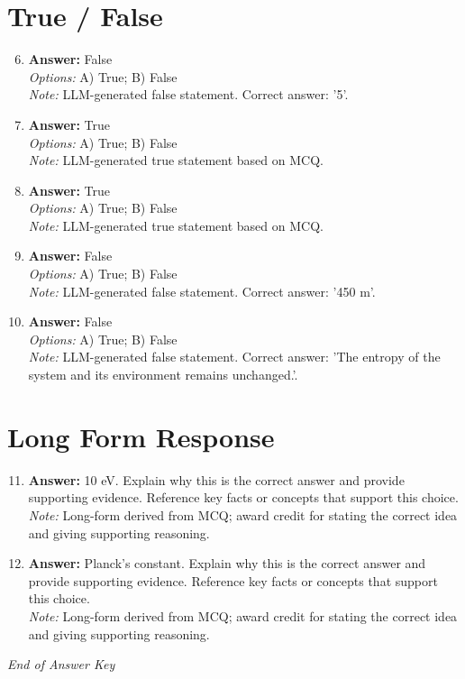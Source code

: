 \documentclass[12pt]{article}
\begin{document}
\section*{True / False}
\begin{enumerate}[label=\arabic*.]
\setcounter{enumi}{5}
\item \textbf{Answer:} False
\\ \textit{Options:} A) True; B) False
\\ \textit{Note:} LLM-generated false statement. Correct answer: '5'.
\item \textbf{Answer:} True
\\ \textit{Options:} A) True; B) False
\\ \textit{Note:} LLM-generated true statement based on MCQ.
\item \textbf{Answer:} True
\\ \textit{Options:} A) True; B) False
\\ \textit{Note:} LLM-generated true statement based on MCQ.
\item \textbf{Answer:} False
\\ \textit{Options:} A) True; B) False
\\ \textit{Note:} LLM-generated false statement. Correct answer: '450 m'.
\item \textbf{Answer:} False
\\ \textit{Options:} A) True; B) False
\\ \textit{Note:} LLM-generated false statement. Correct answer: 'The entropy of the system and its environment remains unchanged.'.
\end{enumerate}

\section*{Long Form Response}
\begin{enumerate}[label=\arabic*.]
\setcounter{enumi}{10}
\item \textbf{Answer:} 10 eV. Explain why this is the correct answer and provide supporting evidence. Reference key facts or concepts that support this choice.
\\ \textit{Note:} Long-form derived from MCQ; award credit for stating the correct idea and giving supporting reasoning.
\item \textbf{Answer:} Planck's constant. Explain why this is the correct answer and provide supporting evidence. Reference key facts or concepts that support this choice.
\\ \textit{Note:} Long-form derived from MCQ; award credit for stating the correct idea and giving supporting reasoning.
\end{enumerate}

\vfill
\noindent\textit{End of Answer Key}
\end{document}
